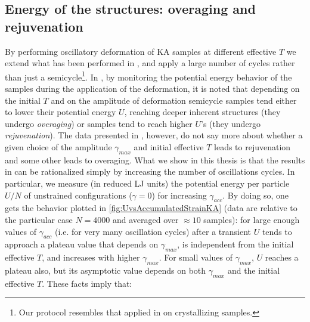 \subsection{Energy of the structures: overaging and rejuvenation \label{sec:EnergyBehavior}}

By performing oscillatory deformation of KA samples at different effective $T$ we extend what has been performed in \cite{lacks2004energy}, and apply a large number of cycles rather than just a semicycle\footnote{Our protocol resembles that applied in \cite{duff2007shear} on crystallizing samples.}. In \cite{lacks2004energy}, by monitoring the potential energy behavior of the samples during the application of the deformation, it is noted that depending on the initial $T$ and on the amplitude of deformation semicycle samples tend either to lower their potential energy $U$, reaching deeper inherent structures (they undergo \emph{overaging}) or samples tend to reach higher $U$'s (they undergo \emph{rejuvenation}). The data presented in \cite{lacks2004energy}, however, do not say more about whether a given choice of the amplitude $\gamma_{max}$ and initial effective $T$ leads to rejuvenation and some other leads to overaging. What we show in this thesis is that the results in \cite{lacks2004energy} can be rationalized simply by increasing the number of oscillations cycles. In particular, we measure (in reduced LJ units) the potential energy per particle $U/N$ of unstrained configurations ($\gamma = 0$) for increasing $\gamma_{acc}$. 
By doing so, one gets the behavior plotted in \autoref{fig:UvsAccumulatedStrainKA} (data are relative to the particular case $N=4000$ and averaged over $\approx 10$ samples): for large enough values of $\gamma_{acc}$ (i.e. for very many oscillation cycles) after a transient $U$ tends to approach a plateau value that depends on $\gamma_{max}$, is independent from the initial effective $T$, and increases with higher $\gamma_{max}$. For small values of $\gamma_{max}$, $U$ reaches a plateau also, but its asymptotic value depends on both $\gamma_{max}$ and the initial effective $T$. These facts imply that:

